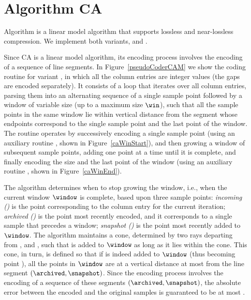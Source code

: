 
\clearpage

\section{Algorithm CA}
\label{algo:ca}


Algorithm \textit{\CAfull} \cite{coder:ca} is a linear model algorithm that supports lossless and near-lossless compression. \WindowParam We implement both variants, \maskalgo and \NOmaskalgo.


Since CA is a linear model algorithm, its encoding process involves the encoding of a sequence of line segments. In Figure~\ref{pseudoCoderCAM} we show the coding routine for variant \maskalgo, in which all the column entries are integer values (the gaps are encoded separately). It consists of a loop that iterates over all column entries, parsing them into an alternating sequence of a single sample point followed by a window of variable size (up to a maximum size $\win$), such that all the sample points in the same window lie within vertical distance \maxerror from the segment whose endpoints correspond to the single sample point and the last point of the window. The routine operates by successively encoding a single sample point (using an auxiliary routine \CAWinStart, shown in Figure~\ref{caWinStart}), and then growing a window of subsequent sample points, adding one point at a time until it is complete, and finally encoding the size and the last point of the window (using an auxiliary routine \CAWinEnd, shown in Figure~\ref{caWinEnd}).





\clearpage


The algorithm determines when to stop growing the window, i.e., when the current window $\window$ is complete, based upon three sample points: \textit{incoming (\incoming)} is the point corresponding to the column entry for the current iteration; \textit{archived (\archived)} is the point most recently encoded, and it corresponds to a single sample that precedes a window; \textit{snapshot (\snapshot)} is the point most recently added to $\window$. The algorithm maintains a cone, determined by two rays departing from \archived, \smin and \smax, such that \incoming is added to $\window$ as long as it lies within the cone. This cone, in turn, is defined so that if \incoming is indeed added to $\window$ (thus becoming point \snapshot), all the points in $\window$ are at a vertical distance at most \maxerror from the line segment $(\archived, \snapshot)$. Since the encoding process involves the encoding of a sequence of these segments $(\archived, \snapshot)$, the absolute error between the encoded and the original samples is guaranteed to be at most \maxerror.



